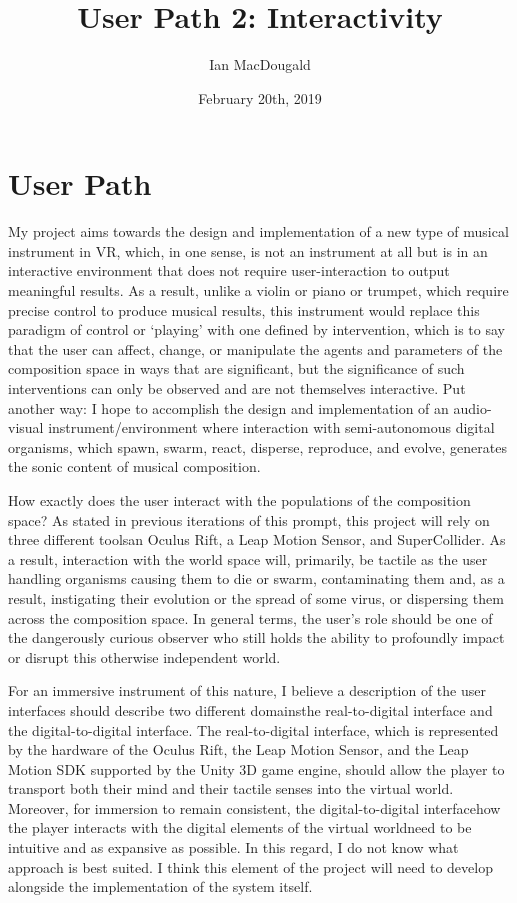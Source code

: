 \documentclass[12pt]{article}
\title{User Path 2: Interactivity}
\author{Ian MacDougald}
\date{February 20th, 2019}
\begin{document}
	\setlength{\droptitle}{-10em}
	\maketitle
	\onehalfspacing
	\section*{User Path}
	
	My project aims towards the design and implementation of a new type of musical instrument in VR, which, in one sense, is not an instrument at all but is in an interactive environment that does not require user-interaction to output meaningful results. As a result, unlike a violin or piano or trumpet, which require precise control to produce musical results, this instrument would replace this paradigm of control or `playing' with one defined by intervention, which is to say that the user can affect, change, or manipulate the agents and parameters of the composition space in ways that are significant, but the significance of such interventions can only be observed and are not themselves interactive. Put another way: I hope to accomplish the design and implementation of an audio-visual instrument/environment where interaction with semi-autonomous digital organisms, which spawn, swarm, react, disperse, reproduce, and evolve, generates the sonic content of musical composition. 
	
	How exactly does the user interact with the populations of the composition space? As stated in previous iterations of this prompt, this project will rely on three different tools\textemdash an Oculus Rift, a Leap Motion Sensor, and SuperCollider. As a result, interaction with the world space will, primarily, be tactile as the user handling organisms causing them to die or swarm, contaminating them and, as a result, instigating their evolution or the spread of some virus, or dispersing them across the composition space. In general terms, the user's role should be one of the dangerously curious observer who still holds the ability to profoundly impact or disrupt this otherwise independent world. 
	
	For an immersive instrument of this nature, I believe a description of the user interfaces should describe two different domains\textemdash the real-to-digital interface and the digital-to-digital interface. The real-to-digital interface, which is represented by the hardware of the Oculus Rift, the Leap Motion Sensor, and the Leap Motion SDK supported by the Unity 3D game engine, should allow the player to transport both their mind and their tactile senses into the virtual world. Moreover, for immersion to remain consistent, the digital-to-digital interface\textemdash how the player interacts with the digital elements of the virtual world\textemdash need to be intuitive and as expansive as possible. In this regard, I do not know what approach is best suited. I think this element of the project will need to develop alongside the implementation of the system itself. 
\end{document}
